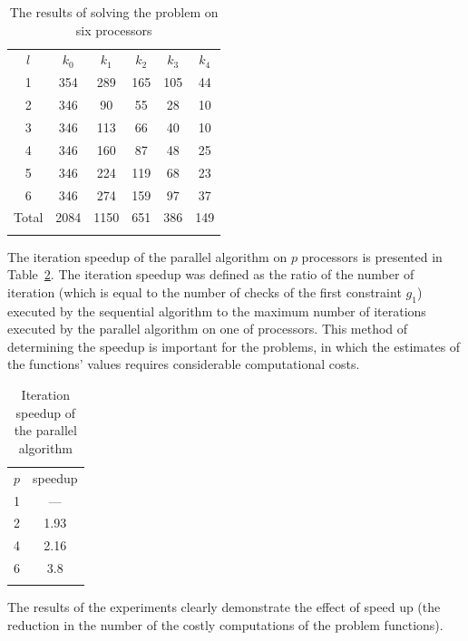 \begin{table}
	\caption{The results of solving the problem on six processors}
	\label{6_tab4}
	\center
	\begin{tabular}{cccccc}
		\hline\noalign{\smallskip}
		$l$  & $k_0$ &$k_1$ & $k_2$ & $k_3$ & $k_4$    \\
		\noalign{\smallskip} \hline \noalign{\smallskip}
1	&	354	&	289	&	165	&	105	&	44	\\
2	&	346	&	90	&	55	&	28	&	10	\\
3	&	346	&	113	&	66	&	40	&	10	\\
4	&	346	&	160	&	87	&	48	&	25	\\
5	&	346	&	224	&	119	&	68	&	23	\\
6	&	346	&	274	&	159	&	97	&	37	\\
		\noalign{\smallskip}\hline\noalign{\smallskip}
Total	&	2084	&	1150	&	651	&	386	&	149	\\
		\noalign{\smallskip}\hline
	\end{tabular}
\end{table}


The iteration speedup of the parallel algorithm on $p$ processors is presented in Table~\ref{6_tab5}. The iteration speedup was defined as the ratio of the number of iteration (which is equal to the number of checks of the first constraint $g_1$) executed by the sequential algorithm to the maximum number of iterations executed by the parallel algorithm on one of processors. This method of determining the speedup is important for the problems, in which the estimates of the functions' values requires considerable computational costs.

\begin{table}
	\caption{Iteration speedup of the parallel algorithm }
	\label{6_tab5}
	\center
	\begin{tabular}{cc}
		\hline\noalign{\smallskip}
		$p$  & speedup     \\
		\noalign{\smallskip} \hline \noalign{\smallskip}
		1 	&	--- \\
		2 	&	1.93 \\
		4 	&	2.16 \\
		6 	&	3.8 \\
		\noalign{\smallskip}\hline
	\end{tabular}
\end{table}

The results of the experiments clearly demonstrate the effect of speed up (the reduction in the number of the costly computations of the problem functions).

